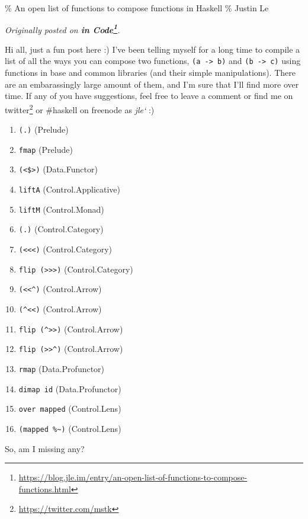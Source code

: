 \documentclass[]{article}
\renewcommand{\href}[2]{#2\footnote{\url{#1}}}
\begin{document}
\% An open list of functions to compose functions in Haskell \% Justin Le

\emph{Originally posted on
\textbf{\href{https://blog.jle.im/entry/an-open-list-of-functions-to-compose-functions.html}{in
Code}}.}

Hi all, just a fun post here :) I've been telling myself for a long time to
compile a list of all the ways you can compose two functions,
\texttt{(a\ -\textgreater{}\ b)} and \texttt{(b\ -\textgreater{}\ c)} using
functions in base and common libraries (and their simple manipulations). There
are an embarassingly large amount of them, and I'm sure that I'll find more over
time. If any of you have suggestions, feel free to leave a comment or find me on
\href{https://twitter.com/mstk}{twitter} or \#haskell on freenode as \emph{jle`}
:)

\begin{enumerate}
\tightlist
\item
  \texttt{(.)} (Prelude)
\item
  \texttt{fmap} (Prelude)
\item
  \texttt{(\textless{}\$\textgreater{})} (Data.Functor)
\item
  \texttt{liftA} (Control.Applicative)
\item
  \texttt{liftM} (Control.Monad)
\item
  \texttt{(.)} (Control.Category)
\item
  \texttt{(\textless{}\textless{}\textless{})} (Control.Category)
\item
  \texttt{flip\ (\textgreater{}\textgreater{}\textgreater{})} (Control.Category)
\item
  \texttt{(\textless{}\textless{}\^{})} (Control.Arrow)
\item
  \texttt{(\^{}\textless{}\textless{})} (Control.Arrow)
\item
  \texttt{flip\ (\^{}\textgreater{}\textgreater{})} (Control.Arrow)
\item
  \texttt{flip\ (\textgreater{}\textgreater{}\^{})} (Control.Arrow)
\item
  \texttt{rmap} (Data.Profunctor)
\item
  \texttt{dimap\ id} (Data.Profunctor)
\item
  \texttt{over\ mapped} (Control.Lens)
\item
  \texttt{(mapped\ \%\textasciitilde{})} (Control.Lens)
\end{enumerate}

So, am I missing any?
\end{document}
